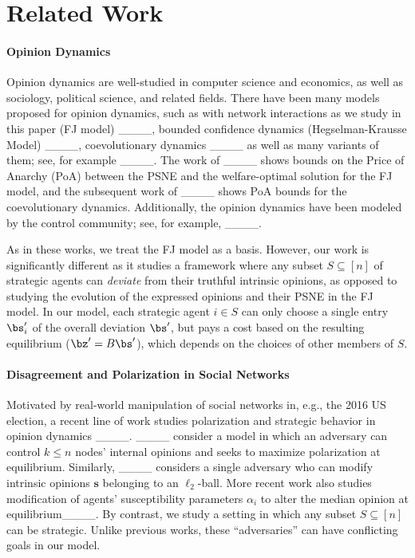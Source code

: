 \section{Related Work}
\paragraph{Opinion Dynamics} Opinion dynamics are well-studied in computer science and economics, as well as sociology, political science, and related fields. There have been many models proposed for opinion dynamics, such as with network interactions as we study in this paper (FJ model) ____, bounded confidence dynamics (Hegselman-Krausse Model) ____, coevolutionary dynamics ____ as well as many variants of them; see, for example ____. The work of ____ shows bounds on the Price of Anarchy (PoA) between the PSNE and the welfare-optimal solution for the FJ model, and the subsequent work of ____ shows PoA bounds for the coevolutionary dynamics. Additionally, the opinion dynamics have been modeled by the control community; see, for example, ____. 

As in these works, we treat the FJ model as a basis. However, our work is significantly different as it studies a framework where any subset $S \subseteq [n]$ of strategic agents can {\em deviate} from their truthful intrinsic opinions, as opposed to studying the evolution of the expressed opinions and their PSNE in the FJ model. In our model, each strategic agent $i \in S$ can only choose a single entry $\bs_i^\prime$ of the overall deviation $\bs^\prime$, but pays a cost based on the resulting equilibrium ($\bz^\prime = B \bs^\prime$), which depends on the choices of other members of $S$. 

\paragraph{Disagreement and Polarization in Social Networks} Motivated by real-world manipulation of social networks in, e.g., the 2016 US election, a recent line of work studies polarization and strategic behavior in opinion dynamics ____. 
____ consider a model in which an adversary can control $k \leq n$ nodes' internal opinions and seeks to maximize polarization at equilibrium. Similarly, ____ considers a single adversary who can modify intrinsic opinions $\bm{s}$ belonging to an $\ell_2$-ball. More recent work also studies modification of agents' susceptibility parameters $\alpha_i$ to alter the median opinion at equilibrium____. By contrast, we study a setting in which any subset $S \subseteq [n]$ can be strategic. Unlike previous works, these ``adversaries'' can have conflicting goals in our model.

